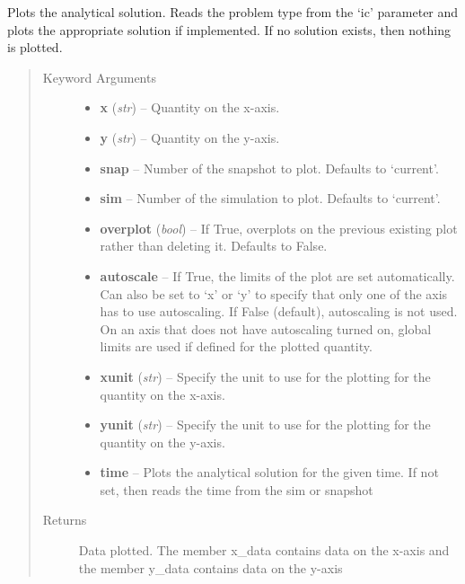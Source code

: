 \documentclass[letterpaper,10pt,english]{sphinxmanual}
\begin{document}
\begin{fulllineitems}
\label{index:facade.plotanalytical}
Plots the analytical solution.  Reads the problem type from the `ic'
parameter and plots the appropriate solution if implemented.  If no solution
exists, then nothing is plotted.
\begin{quote}\begin{description}
\item[{Keyword Arguments}] \leavevmode\begin{itemize}
\item {} 
\textbf{x} (\emph{str}) --
Quantity on the x-axis.

\item {} 
\textbf{y} (\emph{str}) --
Quantity on the y-axis.

\item {} 
\textbf{snap} --
Number of the snapshot to plot. Defaults to `current'.

\item {} 
\textbf{sim} --
Number of the simulation to plot. Defaults to `current'.

\item {} 
\textbf{overplot} (\emph{bool}) --
If True, overplots on the previous existing plot rather
than deleting it. Defaults to False.

\item {} 
\textbf{autoscale} --
If True, the limits of the plot are set
automatically.  Can also be set to `x' or `y' to specify
that only one of the axis has to use autoscaling.
If False (default), autoscaling is not used. On an axis that does
not have autoscaling turned on, global limits are used
if defined for the plotted quantity.

\item {} 
\textbf{xunit} (\emph{str}) --
Specify the unit to use for the plotting for the quantity
on the x-axis.

\item {} 
\textbf{yunit} (\emph{str}) --
Specify the unit to use for the plotting for the quantity
on the y-axis.

\item {} 
\textbf{time} --
Plots the analytical solution for the given time.
If not set, then reads the time from the sim or snapshot

\end{itemize}

\item[{Returns}] \leavevmode
Data plotted. The member x\_data contains data on the x-axis and the member y\_data
contains data on the y-axis

\end{description}\end{quote}

\end{fulllineitems}
\end{document}
